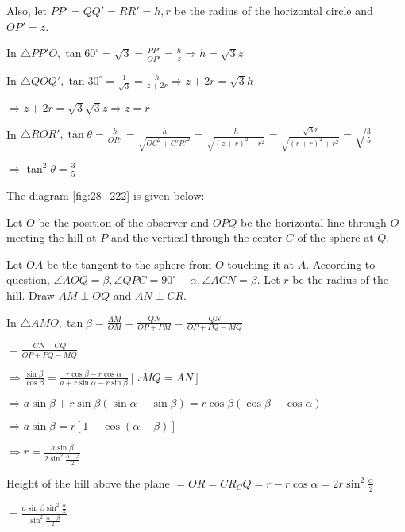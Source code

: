   Also, let $PP' = QQ' = RR' = h, r$ be the radius of the horizontal circle and $OP' = z$.

  In $\triangle PP'O, \tan60^\circ = \sqrt{3} = \frac{PP'}{OP'} = \frac{h}{z} \Rightarrow h =
  \sqrt{3}z$

  In $\triangle QOQ', \tan30^\circ = \frac{1}{\sqrt{3}} = \frac{h}{z + 2r} \Rightarrow z + 2r =
  \sqrt{3}h$

  $\Rightarrow z + 2r = \sqrt{3}\sqrt{3}z \Rightarrow z = r$

  In $\triangle ROR', \tan\theta = \frac{h}{OR'} = \frac{h}{\sqrt{OC^2 + C'R'^2}} =
  \frac{h}{\sqrt{(z + r)^2 + r^2}} = \frac{\sqrt{3}r}{\sqrt{(r + r)^2 + r^2}} = \sqrt{\frac{3}{5}}$

  $\Rightarrow \tan^2\theta = \frac{3}{5}$

\item The diagram [fig:28_222]  is given below:

  \startplacefigure[reference=fig:28_222]
    \externalfigure[28_222.pdf]
  \stopplacefigure

  Let $O$ be the position of the observer and $OPQ$ be the horizontal line through $O$
  meeting the hill at $P$ and the vertical through the center $C$ of the sphere at $Q$.

  Let $OA$ be the tangent to the sphere from $O$ touching it at $A$. According to
  question, $\angle AOQ = \beta, \angle QPC = 90^\circ - \alpha, \angle ACN = \beta$. Let $r$
  be the radius of the hill. Draw $AM\perp OQ$ and $AN\perp CR$.

  In $\triangle AMO, \tan\beta = \frac{AM}{OM} = \frac{QN}{OP + PM} = \frac{QN}{OP + PQ - MQ}$

  $= \frac{CN - CQ}{OP + PQ - MQ}$

  $\Rightarrow \frac{\sin\beta}{\cos\beta} = \frac{r\cos\beta - r\cos\alpha}{a + r\sin\alpha -
    r\sin\beta} [\because MQ = AN]$

  $\Rightarrow a\sin\beta + r\sin\beta(\sin\alpha - \sin\beta) = r\cos\beta(\cos\beta -
  \cos\alpha)$

  $\Rightarrow a\sin\beta = r[1 - \cos(\alpha - \beta)]$

  $\Rightarrow r = \frac{a\sin\beta}{2\sin^2\frac{\alpha - \beta}{2}}$

  Height of the hill above the plane $= OR = CR _ CQ = r - r\cos\alpha = 2r\sin^2\frac{\alpha}{2}$

  $= \frac{a\sin\beta\sin^2\frac{\alpha}{2}}{\sin^2\frac{\alpha - \beta}{2}}$

